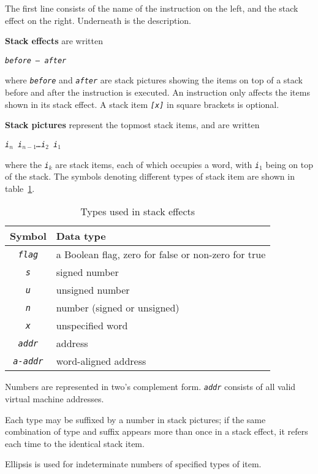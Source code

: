 \documentclass[a4paper]{article}
\newcommand{\spic}[1]{\texttt{\textsl{#1\/}}}
\begin{document}
The first line consists of the name of the instruction on the left, and the stack effect on the right. Underneath is the description.

{\bf Stack effects} are written

\centerline{\tt \spic{before — after}}

\noindent where \spic{before} and \spic{after} are stack pictures showing the items on top of a stack before and after the instruction is executed. An instruction only affects the items shown in its stack effect. A stack item \spic{[x]} in square brackets is optional.

{\bf Stack pictures}
represent the topmost stack items, and are written

\centerline{\spic{i$_n$ i$_{n-1}$\dots i$_2$ i$_1$}}

\noindent where the \spic{i$_k$} are stack items, each of which occupies a word, with \spic{i$_1$} being on top of the stack. The symbols denoting different types of stack item are shown in table~\ref{typetable}.

\begin{table}[htbp]
\begin{center}
\begin{tabular}{cl} \toprule
\bf Symbol & \bf Data type \\ \midrule
\spic{flag} & a Boolean flag, zero for false or non-zero for true \\
\spic{s} & signed number \\
\spic{u} & unsigned number \\
\spic{n} & number (signed or unsigned) \\
\spic{x} & unspecified word \\
\spic{addr} & address \\
\spic{a-addr} & word-aligned address \\
\bottomrule
\end{tabular}
\caption{\label{typetable}Types used in stack effects}
\end{center}
\end{table}

Numbers are represented in two's complement form. \spic{addr} consists of all
valid virtual machine addresses.

Each type may be suffixed by a number in stack pictures; if the same combination
of type and suffix appears more than once in a stack effect, it refers each time to the identical stack item.

Ellipsis is used for indeterminate numbers of specified types of item.
\end{document}
